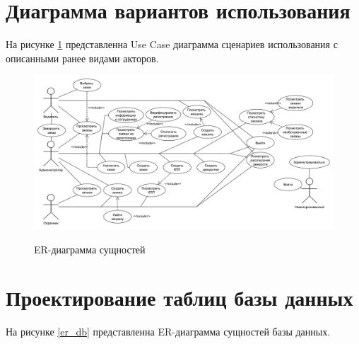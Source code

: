 \section{Диаграмма вариантов использования}
На рисунке \ref{use_case} представленна Use Case диаграмма сценариев использования с описанными ранее видами акторов.


\begin{figure}[ph!]
	\begin{center}
		{\includegraphics[scale=0.4, angle=-90]{schemes/use-case.pdf}}
		\caption{ER-диаграмма сущностей}
		\label{use_case}
	\end{center}
\end{figure}


\section{Проектирование таблиц базы данных}
На рисунке \ref{er_db} представленна ER-диаграмма сущностей базы данных.

